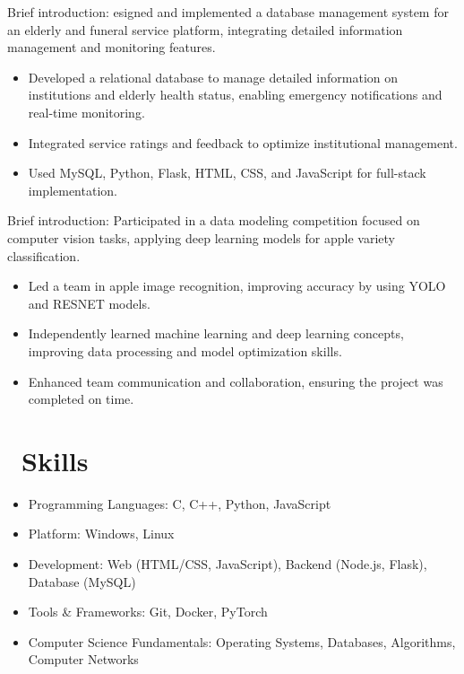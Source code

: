 \documentclass{resume}
\begin{document}
Brief introduction: esigned and implemented a database management system for an elderly and funeral service platform, integrating detailed information management and monitoring features.
\begin{itemize}
  \item Developed a relational database to manage detailed information on institutions and elderly health status, enabling emergency notifications and real-time monitoring.
  \item Integrated service ratings and feedback to optimize institutional management.
  \item Used MySQL, Python, Flask, HTML, CSS, and JavaScript for full-stack implementation.
\end{itemize}

Brief introduction: Participated in a data modeling competition focused on computer vision tasks, applying deep learning models for apple variety classification.
\begin{itemize}
  \item Led a team in apple image recognition, improving accuracy by using YOLO and RESNET models. 
  \item Independently learned machine learning and deep learning concepts, improving data processing and model optimization skills.
  \item Enhanced team communication and collaboration, ensuring the project was completed on time.
\end{itemize}


\section{\faCogs\ Skills}
\begin{itemize}[parsep=0.5ex]
  \item Programming Languages: C, C++, Python, JavaScript
  \item Platform: Windows, Linux
  \item Development: Web (HTML/CSS, JavaScript), Backend (Node.js, Flask), Database (MySQL)
  \item Tools \& Frameworks: Git, Docker, PyTorch
  \item Computer Science Fundamentals: Operating Systems, Databases, Algorithms, Computer Networks
\end{itemize}
\end{document}
